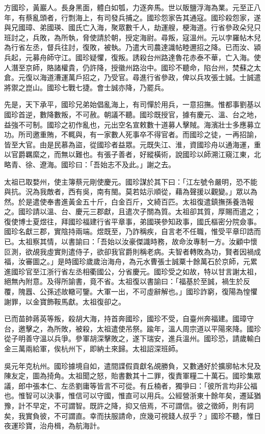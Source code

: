方國珍，黃巖人。長身黑面，體白如瓠，力逐奔馬。世以販鹽浮海為業。元至正八年，有蔡亂頭者，行剽海上，有司發兵捕之。國珍怨家告其通寇。國珍殺怨家，遂與兄國璋、弟國瑛、國氏亡入海，聚眾數千人，劫運艘，梗海道。行省參政朵兒只班討之，兵敗，為所執，脅使請於朝，授定海尉。尋叛，寇溫州。元以孛羅帖木兒為行省左丞，督兵往討，復敗，被執。乃遣大司農達識帖睦邇招之降。已而汝、潁兵起，元募舟師守江。國珍疑懼，復叛。誘殺台州路達魯花赤泰不華，亡入海。使人潛至京師，賂諸權貴，仍許降，授徽州路治中。國珍不聽命，陷台州，焚蘇之太倉。元復以海道漕運萬戶招之，乃受官。尋進行省參政，俾以兵攻張士誠。士誠遣將禦之崑山。國珍七戰七捷。會士誠亦降，乃罷兵。

先是，天下承平，國珍兄弟始倡亂海上，有司憚於用兵，一意招撫。惟都事劉基以國珍首逆，數降數叛，不可赦。朝議不聽。國珍既授官，據有慶元、溫、台之地，益強不可制。國珍之初作亂也，元出空名宣敕數十道募人擊賊。海濱壯士多應募立功。所司邀重賄，不輒與，有一家數人死事卒不得官者。而國珍之徒，一再招諭，皆至大官。由是民慕為盜，從國珍者益眾。元既失江、淮，資國珍舟以通海運，重以官爵羈縻之，而無以難也。有張子善者，好縱橫術，說國珍以師溯江窺江東，北略青、徐、遼海。國珍曰：「吾始志不及此。」謝之去。

太祖已取婺州，使主簿蔡元剛使慶元。國珍謀於其下曰：「江左號令嚴明，恐不能與抗。況為我敵者，西有吳，南有閩。莫若姑示順從，藉為聲援以觀變。」眾以為然。於是遣使奉書進黃金五十斤，白金百斤，文綺百匹。太祖復遣鎮撫孫養浩報之。國珍請以溫、台、慶元三郡獻，且遣次子關為質。太祖卻其質，厚賜而遣之；復使博士夏煜往，拜國珍福建行省平章事，弟國瑛參知政事，國氏樞密分院僉事。國珍名獻三郡，實陰持兩端。煜既至，乃詐稱疾，自言老不任職，惟受平章印誥而已。太祖察其情，以書諭曰：「吾始以汝豪傑識時務，故命汝專制一方。汝顧中懷叵測，欲覘我虛實則遣侍子，欲卻我官爵則稱老病。夫智者轉敗為功，賢者因禍成福，汝審圖之。」是時國珍歲歲治海舟，為元水曹張士誠粟十餘萬石於京師，元累進國珍官至江浙行省左丞相衢國公，分省慶元。國珍受之如故，特以甘言謝太祖，絕無內附意。及得所諭書，竟不省。太祖復以書諭曰：「福基於至誠，禍生於反覆，隗囂、公孫述故轍可鑒。大軍一出，不可虛辭解也。」國珍詐窮，復陽為惶懼謝罪，以金寶飾鞍馬獻。太祖復卻之。

已而苗帥蔣英等叛，殺胡大海，持首奔國珍，國珍不受，自臺州奔福建。國璋守台，邀擊之，為所敗，被殺，太祖遣使吊祭。踰年，溫人周宗道以平陽來降。國珍從子明善守溫以兵爭。參軍胡深擊敗之，遂下瑞安，進兵溫州。國珍恐，請歲輸白金三萬兩給軍，俟杭州下，即納土來歸。太祖詔深班師。

吳元年克杭州。國珍據境自如，遣間諜假貢獻名覘勝負，又數通好於擴廓帖木兒及陳友定，圖為掎角。太祖聞之怒，貽書數其十二罪，復責軍糧二十萬石。國珍集眾議，郎中張本仁、左丞劉庸等皆言不可從。有丘楠者，獨爭曰：「彼所言均非公福也。惟智可以決事，惟信可以守國，惟直可以用兵。公經營浙東十餘年矣，遷延猶豫，計不早定，不可謂智。既許之降，抑又倍焉，不可謂信。彼之徵師，則有詞矣，我實負彼，不可謂直。幸而扶服請命，庶幾可視錢人叔乎？」國珍不聽，惟日夜運珍寶，治舟楫，為航海計。

